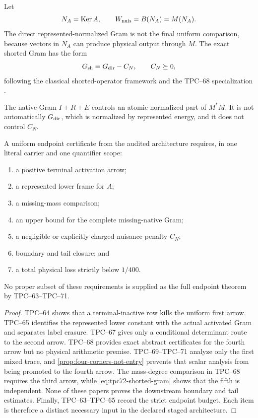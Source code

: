 Let
\[
 N_A=\operatorname{Ker} A,
 \qquad
 W_{\rm nuis}=B(N_A)=M(N_A).
\]
The direct represented-normalized Gram is not the final uniform comparison,
because vectors in \(N_A\) can produce physical output through \(M\).  The
exact shorted Gram has the form
\begin{equation}
 G_{\rm sh}=G_{\rm dir}-C_N,
 \qquad
 C_N\succeq0,
 \label{eq:tpc72-shorted-gram}
\end{equation}
following the classical shorted-operator framework
\citep{AndersonTrapp1975} and the TPC--68 specialization
\citep{WangTPC68}.

The native Gram \(I+R+E\) controls an atomic-normalized part of \(M^*M\).
It is not automatically \(G_{\rm dir}\), which is normalized by represented
energy, and it does not control \(C_N\).

\begin{theorem}
\label{thm:dependency}
A uniform endpoint certificate from the audited architecture requires, in
one literal carrier and one quantifier scope:
\begin{enumerate}[label=\textup{(\roman*)},leftmargin=3em]
 \item a positive terminal activation arrow;
 \item a represented lower frame for \(A\);
 \item a missing-mass comparison;
 \item an upper bound for the complete missing-native Gram;
 \item a negligible or explicitly charged nuisance penalty \(C_N\);
 \item boundary and tail closure; and
 \item a total physical loss strictly below \(1/400\).
\end{enumerate}
No proper subset of these requirements is supplied as the full endpoint
theorem by TPC--63--TPC--71.
\end{theorem}

\begin{proof}
TPC--64 shows that a terminal-inactive row kills the uniform first arrow.
TPC--65 identifies the represented lower constant with the actual activated
Gram and separates label erasure.  TPC--67 gives only a conditional
determinant route to the second arrow.  TPC--68 provides exact abstract
certificates for the fourth arrow but no physical arithmetic premise.
TPC--69--TPC--71 analyze only the first mixed trace, and
\cref{prop:four-corners-not-entry} prevents that scalar analysis from being
promoted to the fourth arrow.
The mass-degree comparison in TPC--68 requires the third arrow, while
\eqref{eq:tpc72-shorted-gram} shows that the fifth is independent.  None of
these papers proves the downstream boundary and tail estimates.  Finally,
TPC--63--TPC--65 record the strict endpoint budget.  Each item is therefore
a distinct necessary input in the declared staged architecture.
\end{proof}

